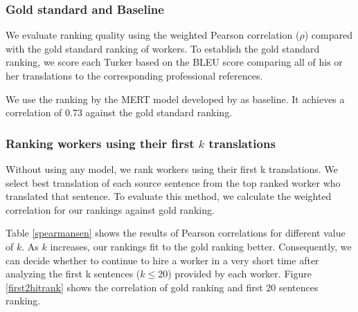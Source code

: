\documentclass[11pt,letterpaper]{article}
\begin{document}
\subsubsection{Gold standard and Baseline}
We evaluate ranking quality using the weighted Pearson correlation ($\rho$) compared with the gold standard ranking of workers. 
To establish the gold standard ranking, we score each Turker based on the BLEU score comparing all of his or her translations to the corresponding professional references.

We use the ranking by the MERT model developed by  as baseline. It achieves a correlation of 0.73 against the gold standard ranking. 




\subsubsection{Ranking workers using their first $k$ translations}
 Without using any model, we rank workers using their first k translations. We select best translation of each source sentence from the top ranked worker who translated that sentence. To evaluate this method, we calculate the weighted correlation for our rankings against gold ranking. 

Table \ref{spearmansen} shows the results of Pearson correlations for different value of $k$. As $k$ increases, our rankings fit to the gold ranking better. Consequently, we can decide whether to continue to hire a worker in a very short time after analyzing the first k sentences ($k\le20$) provided by each worker. Figure \ref{first2hitrank} shows the correlation of gold ranking and first 20 sentences ranking. 
\end{document}
